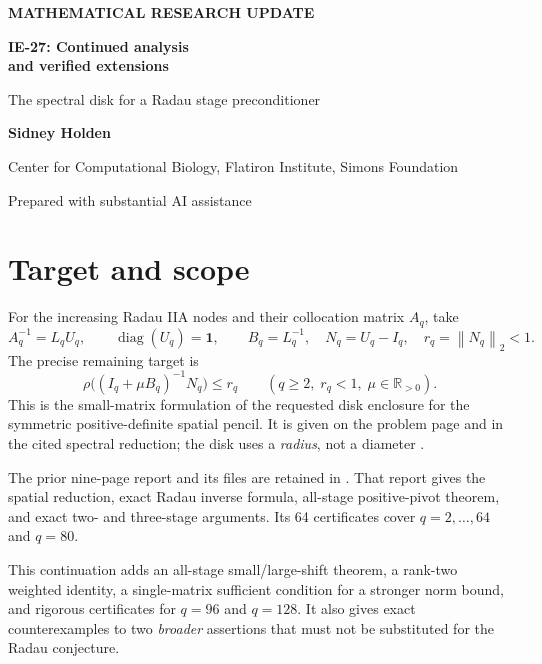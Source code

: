 \documentclass[11pt,letterpaper]{article}
\newcommand{\norm}[1]{\left\|#1\right\|_2}
\newcommand{\code}[1]{\texttt{\detokenize{#1}}}
\begin{document}
{\small\sffamily\bfseries\textcolor{ink}{MATHEMATICAL RESEARCH UPDATE}}

{\LARGE\bfseries\textcolor{ink}{IE-27: Continued analysis\\[3pt]and verified extensions}}

{\large The spectral disk for a Radau stage preconditioner}

\par\textbf{Sidney Holden}\par
{\small Center for Computational Biology, Flatiron Institute, Simons Foundation\par Prepared with substantial AI assistance}\par\vspace{5pt}

\section{Target and scope}
For the increasing Radau IIA nodes and their collocation matrix $A_q$, take
\[
 A_q^{-1}=L_qU_q,\qquad \operatorname{diag}(U_q)=\boldsymbol1,
 \qquad B_q=L_q^{-1},\quad N_q=U_q-I_q,\quad r_q=\norm{N_q}<1.
\]
The precise remaining target is
\begin{equation}\label{eq:target}
 \boxed{\rho\bigl((I_q+\mu B_q)^{-1}N_q\bigr)\le r_q}\qquad
 (q\ge2,\; r_q<1,\; \mu\in\mathbb R_{>0}).
\end{equation}
This is the small-matrix formulation of the requested disk enclosure for the
symmetric positive-definite spatial pencil. It is given on the problem page
and in the cited spectral reduction; the disk uses a \emph{radius}, not a
diameter \cite{problem,outrata}.

The prior nine-page report and its files are retained in
\code{prior_results/}. That report gives the spatial reduction, exact
Radau inverse formula, all-stage positive-pivot theorem, and exact two- and
three-stage arguments. Its 64 certificates cover $q=2,\ldots,64$ and $q=80$.

This continuation adds an all-stage small/large-shift theorem, a rank-two
weighted identity, a single-matrix sufficient condition for a stronger norm
bound, and rigorous certificates for $q=96$ and $q=128$. It also gives exact
counterexamples to two \emph{broader} assertions that must not be substituted
for the Radau conjecture.
\end{document}
